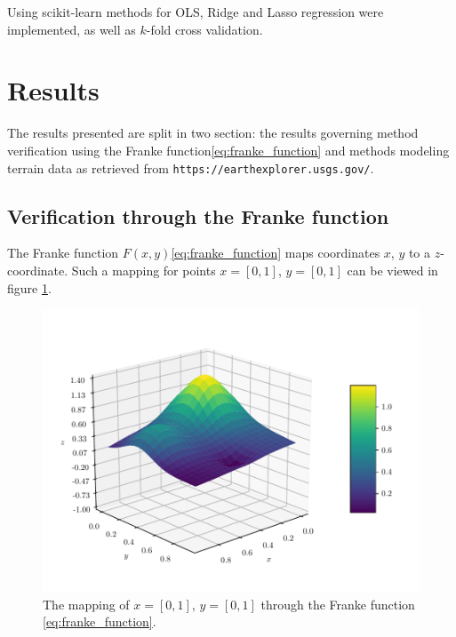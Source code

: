 \documentclass[11pt]{article}
\begin{document}
Using scikit-learn\cite{scikit-learn} methods for OLS, Ridge and Lasso regression were implemented, as well as $k$-fold cross validation.

\section{Results}
The results presented are split in two section: the results governing method verification using the Franke function\eqref{eq:franke_function} and methods modeling terrain data as retrieved from \texttt{https://earthexplorer.usgs.gov/}.

\subsection{Verification through the Franke function}
The Franke function $F(x,y)$\eqref{eq:franke_function} maps coordinates $x$, $y$ to a $z$-coordinate. Such a mapping for points $x=[0,1]$, $y=[0,1]$ can be viewed in figure \ref{fig:franke_function}.
\begin{figure}
    \centering
    \includegraphics[scale=0.5]{../fig/franke_function.pdf}
    \caption{The mapping of $x=[0,1]$, $y=[0,1]$ through the Franke function \eqref{eq:franke_function}.}
    \label{fig:franke_function}
\end{figure}
\end{document}
